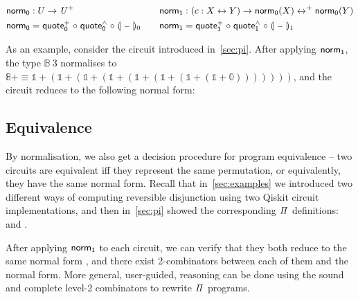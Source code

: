 \begin{definition}
  \begin{gather*}
    \begin{aligned}
      \normt_{0} & : U \to \UPlus                                            \\
      \normt_{0} & = \quotep_{0} \comp \quoteh_{0} \comp \gdenot{\blank}_{0}
    \end{aligned}
    \qquad
    \begin{aligned}
      \normt_{1} & : (c : X \iso Y) \to \normt_{0}(X) \isop \normt_{0}(Y)    \\
      \normt_{1} & = \quotep_{1} \comp \quoteh_{1} \comp \gdenot{\blank}_{1}
    \end{aligned}
  \end{gather*}
\end{definition}

\noindent
As an example, consider the  circuit introduced in~\cref{sec:pi}. After applying $\normt_{1}$, the
type $\mathbb{B}\ 3$ normalises to $\mathbb{8}+ \equiv \mathbb{1} + (\mathbb{1} + (\mathbb{1} + (\mathbb{1} +
  (\mathbb{1} + (\mathbb{1} + (\mathbb{1} + (\mathbb{1} + \mathbb{0})))))))$, and the circuit reduces to the following
normal form:
\medskip
\resetnormtwo{}
\vspace{-1em}

\subsection{Equivalence}

By normalisation, we also get a decision procedure for program equivalence -- two circuits are equivalent iff they
represent the same permutation, or equivalently, they have the same normal form. Recall that in~\cref{sec:examples} we
introduced two different ways of computing reversible disjunction using two Qiskit circuit implementations, and then
in~\cref{sec:pi} showed the corresponding $\mathit{\Pi}$ definitions:  and .

After applying $\normt_{1}$ to each circuit, we can verify that they both reduce to the same normal form
, and there exist 2-combinators between each of them and the normal form. More general,
user-guided, reasoning can be done using the sound and complete level-2 combinators to rewrite $\mathit{\Pi}$ programs.

